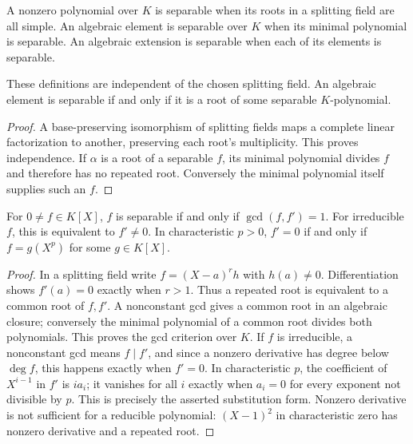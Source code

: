 \begin{definition}
A nonzero polynomial over $K$ is separable when its roots in a splitting field are all simple. An algebraic element is separable over $K$ when its minimal polynomial is separable. An algebraic extension is separable when each of its elements is separable.
\end{definition}
\begin{proposition}
These definitions are independent of the chosen splitting field. An algebraic element is separable if and only if it is a root of some separable $K$-polynomial.
\end{proposition}
\begin{proof}
A base-preserving isomorphism of splitting fields maps a complete linear factorization to another, preserving each root's multiplicity. This proves independence. If $\alpha$ is a root of a separable $f$, its minimal polynomial divides $f$ and therefore has no repeated root. Conversely the minimal polynomial itself supplies such an $f$.
\end{proof}

\begin{theorem}
For $0\ne f\in K[X]$, $f$ is separable if and only if $\gcd(f,f')=1$. For irreducible $f$, this is equivalent to $f'\ne0$. In characteristic $p>0$, $f'=0$ if and only if $f=g(X^p)$ for some $g\in K[X]$.
\end{theorem}
\begin{proof}
In a splitting field write $f=(X-a)^r h$ with $h(a)\ne0$. Differentiation shows $f'(a)=0$ exactly when $r>1$. Thus a repeated root is equivalent to a common root of $f,f'$. A nonconstant gcd gives a common root in an algebraic closure; conversely the minimal polynomial of a common root divides both polynomials. This proves the gcd criterion over $K$. If $f$ is irreducible, a nonconstant gcd means $f\mid f'$, and since a nonzero derivative has degree below $\deg f$, this happens exactly when $f'=0$. In characteristic $p$, the coefficient of $X^{i-1}$ in $f'$ is $ia_i$; it vanishes for all $i$ exactly when $a_i=0$ for every exponent not divisible by $p$. This is precisely the asserted substitution form. Nonzero derivative is not sufficient for a reducible polynomial: $(X-1)^2$ in characteristic zero has nonzero derivative and a repeated root.
\end{proof}

